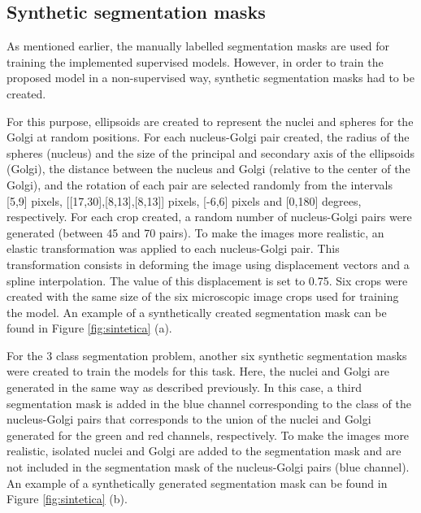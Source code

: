 \subsection*{Synthetic segmentation masks}
\label{subsection:synthetic_masks}

As mentioned earlier, the manually labelled segmentation masks are used for training the implemented supervised models. However, in order to train the proposed model in a non-supervised way, synthetic segmentation masks had to be created. 

For this purpose, ellipsoids are created to represent the nuclei and spheres for the Golgi at random positions. For each nucleus-Golgi pair created, the radius of the spheres (nucleus) and the size of the principal and secondary axis of the ellipsoids (Golgi), the distance between the nucleus and Golgi (relative to the center of the Golgi), and the rotation of each pair are selected randomly from the intervals [5,9] pixels, [[17,30],[8,13],[8,13]] pixels, [-6,6] pixels and [0,180] degrees, respectively. For each crop created, a random number of nucleus-Golgi pairs were generated (between 45 and 70 pairs). To make the images more realistic, an elastic transformation was applied to each nucleus-Golgi pair. This transformation consists in deforming the image using displacement vectors and a spline interpolation. The value of this displacement is set to 0.75. Six crops were created with the same size of the six microscopic image crops used for training the model. An example of a synthetically created segmentation mask can be found in Figure \ref{fig:sintetica} (a).

For the 3 class segmentation problem, another six synthetic segmentation masks were created to train the models for this task. Here, the nuclei and Golgi are generated in the same way as described previously. In this case, a third segmentation mask is added in the blue channel corresponding to the class of the nucleus-Golgi pairs that corresponds to the union of the nuclei and Golgi generated for the green and red channels, respectively. To make the images more realistic, isolated nuclei and Golgi are added to the segmentation mask and are not included in the segmentation mask of the nucleus-Golgi pairs (blue channel). An example of a synthetically generated segmentation mask can be found in Figure \ref{fig:sintetica} (b).


